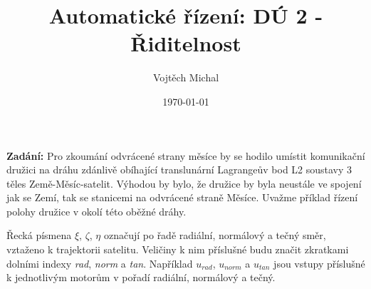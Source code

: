\documentclass[twoside]{article}
\title{Automatické řízení: DÚ 2 - Řiditelnost}
\author{Vojtěch Michal}
\date{\today}
\begin{document}
\maketitle


\newcommand{\rad}{{rad}}
\renewcommand{\norm}{{norm}}
\renewcommand{\tan}{{tan}}

\textbf{Zadání:}
Pro zkoumání odvrácené strany měsíce by se hodilo umístit komunikační družici na dráhu zdánlivě obíhající
translunární Lagrangeův bod L2 soustavy 3 těles Země-Měsíc-satelit. Výhodou by bylo, že družice by byla
neustále ve spojení jak se Zemí, tak se stanicemi
na odvrácené straně Měsíce. Uvažme příklad řízení polohy družice v okolí této oběžné dráhy.

Řecká písmena $\xi$, $\zeta$, $\eta$ označují po řadě radiální, normálový a tečný směr, vztaženo k trajektorii satelitu.
Veličiny k nim příslušné budu značit zkratkami dolními indexy \textit{rad}, \textit{norm} a \textit{tan}.
Například $u_\rad$, $u_\norm$ a $u_\tan$
jsou vstupy příslušné k jednotlivým motorům v pořadí radiální, normálový a tečný.
\end{document}
